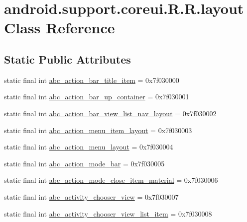 \hypertarget{classandroid_1_1support_1_1coreui_1_1_r_1_1layout}{
\section{android.support.coreui.R.R.layout Class Reference}
\label{classandroid_1_1support_1_1coreui_1_1_r_1_1layout}
}
\subsection*{Static Public Attributes}
\begin{CompactItemize}
\item 
static final int \hyperlink{classandroid_1_1support_1_1coreui_1_1_r_1_1layout_8e82ce1563cab50fbb9c4512fcf3a3a0}{abc\_\-action\_\-bar\_\-title\_\-item} = 0x7f030000
\item 
static final int \hyperlink{classandroid_1_1support_1_1coreui_1_1_r_1_1layout_7c6f3508cd3576b3b348a010dc756f62}{abc\_\-action\_\-bar\_\-up\_\-container} = 0x7f030001
\item 
static final int \hyperlink{classandroid_1_1support_1_1coreui_1_1_r_1_1layout_5884900bf1fa569e7c837f508721395a}{abc\_\-action\_\-bar\_\-view\_\-list\_\-nav\_\-layout} = 0x7f030002
\item 
static final int \hyperlink{classandroid_1_1support_1_1coreui_1_1_r_1_1layout_2e868b459768a2d3177f59fd20055288}{abc\_\-action\_\-menu\_\-item\_\-layout} = 0x7f030003
\item 
static final int \hyperlink{classandroid_1_1support_1_1coreui_1_1_r_1_1layout_8e6978c6adf1809ceb5b23d206ef8fc5}{abc\_\-action\_\-menu\_\-layout} = 0x7f030004
\item 
static final int \hyperlink{classandroid_1_1support_1_1coreui_1_1_r_1_1layout_253bac4ac5dbe9e7213be5b634935bfe}{abc\_\-action\_\-mode\_\-bar} = 0x7f030005
\item 
static final int \hyperlink{classandroid_1_1support_1_1coreui_1_1_r_1_1layout_b84d1bb38399c75c681e6dbd477805f4}{abc\_\-action\_\-mode\_\-close\_\-item\_\-material} = 0x7f030006
\item 
static final int \hyperlink{classandroid_1_1support_1_1coreui_1_1_r_1_1layout_112016fef2fb7246c1b159bb8e8fa3b6}{abc\_\-activity\_\-chooser\_\-view} = 0x7f030007
\item 
static final int \hyperlink{classandroid_1_1support_1_1coreui_1_1_r_1_1layout_3634becb5abf087de0c58ceed53b639d}{abc\_\-activity\_\-chooser\_\-view\_\-list\_\-item} = 0x7f030008

\end{CompactItemize}
